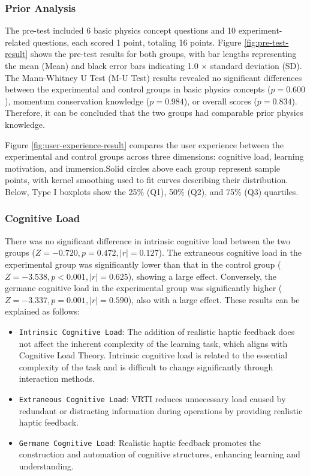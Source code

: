\documentclass[sigconf,review,anonymous]{acmart}
\begin{document}
\subsubsection{Prior Analysis}
The pre-test included 6 basic physics concept questions and 10 experiment-related questions, each scored 1 point, totaling 16 points. Figure \ref{fig:pre-test-result} shows the pre-test results for both groups, with bar lengths representing the mean (Mean) and black error bars indicating 1.0 × standard deviation (SD). The Mann-Whitney U Test (M-U Test) results revealed no significant differences between the experimental and control groups in basic physics concepts ($p=0.600$), momentum conservation knowledge ($p=0.984$), or overall scores ($p=0.834$). Therefore, it can be concluded that the two groups had comparable prior physics knowledge.

Figure \ref{fig:user-experience-result} compares the user experience between the experimental and control groups across three dimensions: cognitive load, learning motivation, and immersion.Solid circles above each group represent sample points, with kernel smoothing used to fit curves describing their distribution. Below, Type I boxplots show the 25\% (Q1), 50\% (Q2), and 75\% (Q3) quartiles.

\subsubsection{Cognitive Load}
There was no significant difference in intrinsic cognitive load between the two groups ($Z=-0.720, p=0.472, |r|=0.127$). The extraneous cognitive load in the experimental group was significantly lower than that in the control group ($Z=-3.538, p<0.001, |r|=0.625$), showing a large effect. Conversely, the germane cognitive load in the experimental group was significantly higher ($Z=-3.337, p=0.001, |r|=0.590$), also with a large effect. These results can be explained as follows:

\begin{itemize}
\item {\texttt{Intrinsic Cognitive Load}}: The addition of realistic haptic feedback does not affect the inherent complexity of the learning task, which aligns with Cognitive Load Theory. Intrinsic cognitive load is related to the essential complexity of the task and is difficult to change significantly through interaction methods.

\item {\texttt{Extraneous Cognitive Load}}: VRTI reduces unnecessary load caused by redundant or distracting information during operations by providing realistic haptic feedback.

\item {\texttt{Germane Cognitive Load}}: Realistic haptic feedback promotes the construction and automation of cognitive structures, enhancing learning and understanding.
\end{itemize}
\end{document}
